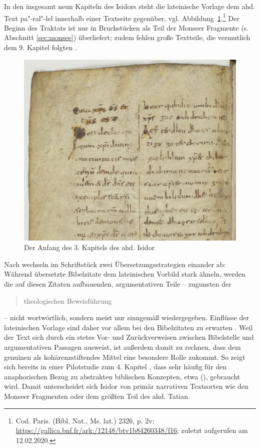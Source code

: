 In den insgesamt neun Kapiteln des Isidors steht die lateinische Vorlage dem ahd. Text pa"-ral"-lel innerhalb einer Textseite gegenüber, vgl. Abbildung~\ref{abb:isidor4}.\footnote{Cod. Paris. (Bibl. Nat., Ms. lat.) 2326, p. 2v; 
\url{https://gallica.bnf.fr/ark:/12148/btv1b84260348/f16}; zuletzt aufgerufen am 12.02.2020.} Der Beginn des Traktats ist nur in Bruchstücken als Teil der Monseer Fragmente (s. Abschnitt \ref{sec:monsee}) überliefert; zudem fehlen große Textteile, die vermutlich dem 9. Kapitel folgten \parencite[25]{Schlachter2012}.

\begin{figure}[h]
\begin{center}
  \includegraphics[width=10 cm]{images/isidor-kap-3-ausschnitt.jpg}
  \caption {Der Anfang des 3. Kapitels des ahd. Isidor}
\label{abb:isidor4}
\end{center}
\end{figure} 


Nach \textcite{Matzel1970} wechseln im Schriftstück zwei Übersetzungsstrategien einander ab: Während übersetzte Bibelzitate dem lateinischen Vorbild stark ähneln, werden die auf diesen Zitaten aufbauenden, argumentativen Teile -- zugunsten der \blockcquote[357]{Matzel1970}{theologischen Beweisführung} -- nicht wortwörtlich, sondern meist nur sinngemäß wiedergegeben. Einflüsse der lateinischen Vorlage sind daher vor allem bei den Bibelzitaten zu erwarten \parencites()()[33]{Fleischer2006}[45--46]{Schlachter2012}. Weil der Text sich durch ein stetes Vor- und Zurückverweisen zwischen Bibelstelle und argumentativen Passagen ausweist, ist außerdem damit zu rechnen, dass dem genuinen   als kohärenzstiftendes Mittel eine besondere Rolle zukommt. So zeigt sich bereits in einer Pilotstudie zum 4. Kapitel \parencite[]{Szczepaniak2015}, dass  sehr häufig für den anaphorischen  Bezug zu abstrakten   biblischen Konzepten, etwa  (), gebraucht wird. Damit unterscheidet sich Isidor von primär narrativen Textsorten wie den Monseer Fragmenten oder dem größten Teil des ahd. Tatian.   


